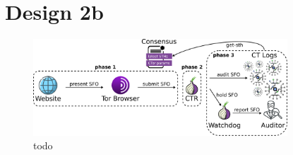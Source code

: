 \section{Design 2b} \label{sec:design-log}
\begin{figure}
    \centering
    \includegraphics[width=0.85\textwidth]{img/design-auditor}
    \caption{todo}
    \label{fig:design-auditor}
\end{figure}

